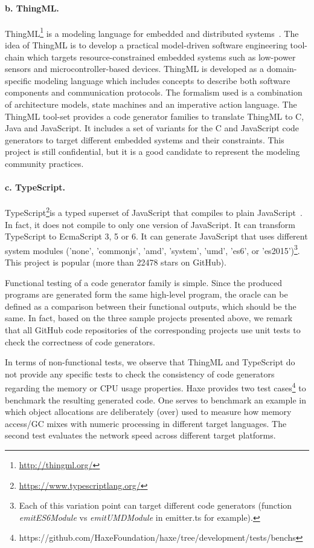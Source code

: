 \paragraph{b. ThingML.} ThingML\footnote{\url{http://thingml.org/}} is a modeling language for embedded and distributed systems~\cite{fleurey2011mde}. The idea of ThingML is to develop a practical model-driven software engineering tool-chain which targets resource-constrained embedded systems such as low-power sensors and microcontroller-based devices. ThingML is developed as a domain-specific modeling language which includes concepts to describe both software components and communication protocols. The formalism used is a combination of architecture models, state machines and an imperative action language. The ThingML tool-set provides a  code generator families  to translate ThingML to C, Java and JavaScript. It includes a set of variants for the C and JavaScript code generators to target different embedded systems and their constraints. 
This project is still confidential, but it is a good candidate to represent the modeling community practices.

\paragraph{c. TypeScript.} TypeScript\footnote{\url{https://www.typescriptlang.org/}}is a typed superset of JavaScript that compiles to plain JavaScript~\cite{rastogi2015safe}. In fact, it does not compile to only one version of JavaScript. It can transform TypeScript to EcmaScript 3, 5 or 6. It can generate JavaScript that uses different system modules ('none', 'commonjs', 'amd', 'system', 'umd', 'es6', or 'es2015')\footnote{Each of this variation point can target different code generators (function \textit{emitES6Module} vs \textit{emitUMDModule} in emitter.ts for example).}. 
This project is popular (more than \num{22478} stars on GitHub).

Functional testing of a code generator family is simple. Since the produced programs are generated form the same high-level program, the oracle can be defined as a comparison between their functional outputs, which should be the same.
In fact, based on the three sample projects presented above, we remark that all GitHub code repositories of the corresponding projects use unit tests to check the correctness of code generators.  

In terms of non-functional tests, we observe that ThingML and TypeScript do not provide any specific tests to check the consistency of code generators regarding the memory or CPU usage properties. Haxe provides two test cases\footnote{https://github.com/HaxeFoundation/haxe/tree/development/tests/benchs} to benchmark the resulting generated code. One serves to benchmark an example in which object allocations are deliberately (over) used to measure how memory access/GC mixes with numeric processing in different target languages. The second test evaluates the network speed across different target platforms.



